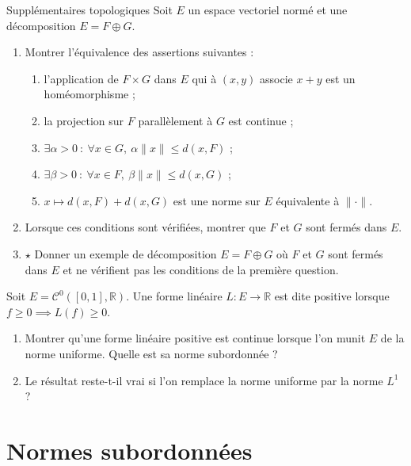 \documentclass[french,a4paper]{article}
\newcommand{\R}{\mathbb{R}}
\theoremstyle{plain}
\theoremstyle{definition}
\theoremstyle{remark}
\begin{document}
\begin{ex}[Moulin.31]{Supplémentaires topologiques}
	Soit $E$ un espace vectoriel normé et une décomposition $E=F\oplus G$.
	\begin{enumerate}
		\item Montrer l'équivalence des assertions suivantes :
		\begin{enumerate}[label=(\roman*)]
			\item l'application de $F\times G$ dans $E$ qui à $(x,y)$ associe $x+y$ est un homéomorphisme ;
			\item la projection sur $F$ parallèlement à $G$ est continue ;
			\item $\exists\alpha>0\ : \ \forall x\in G,\ \alpha\lVert x\rVert \leqslant d(x,F)$ ;
			\item $\exists\beta>0\ : \ \forall x\in F,\ \beta\lVert x\rVert \leqslant d(x,G)$ ;
			\item $x\mapsto d(x,F)+d(x,G)$ est une norme sur $E$ équivalente à $\lVert\cdot\rVert$.
		\end{enumerate}
		\item Lorsque ces conditions sont vérifiées, montrer que $F$ et $G$ sont fermés dans $E$.
		\item $\star$ Donner un exemple de décomposition $E=F\oplus G$ où $F$ et $G$ sont fermés dans $E$ et ne vérifient pas les conditions de la première question.
	\end{enumerate}
\end{ex}

\begin{ex}[Moulin.32]{}
	Soit $E=\mathcal{C}^0([0,1],\R)$. Une forme linéaire $L:E\to\R$ est dite positive lorsque $f\geqslant 0\implies L(f)\geqslant0$.
	\begin{enumerate}
		\item Montrer qu'une forme linéaire positive est continue lorsque l'on munit $E$ de la norme uniforme. Quelle est sa norme subordonnée ?
		\item Le résultat reste-t-il vrai si l'on remplace la norme uniforme par la norme $L^1$ ?
	\end{enumerate}
\end{ex}

\section{Normes subordonnées}
\end{document}
